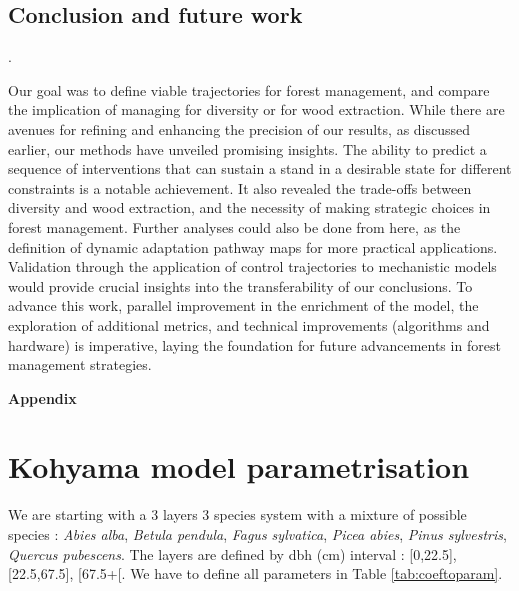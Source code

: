 \documentclass{article}
\begin{document}
\subsection{Conclusion and future work}.

Our goal was to define viable trajectories for forest management, and compare the implication of managing for diversity or for wood extraction. While there are avenues for refining and enhancing the precision of our results, as discussed earlier, our methods have unveiled promising insights. The ability to predict a sequence of interventions that can sustain a stand in a desirable state for different constraints is a notable achievement. It also revealed the trade-offs between diversity and wood extraction, and the necessity of making strategic choices in forest management.
Further analyses could also be done from here, as the definition of dynamic adaptation pathway maps for more practical applications. Validation through the application of control trajectories to mechanistic models would provide crucial insights into the transferability of our conclusions. To advance this work, parallel improvement in the enrichment of the model, the exploration of additional metrics, and technical improvements (algorithms and hardware) is imperative, laying the foundation for future advancements in forest management strategies.

\clearpage

\begin{singlespace}
    \printbibliography
\end{singlespace}

\clearpage


\begin{center}
    \textbf{\Large Appendix}
\end{center}


\renewcommand{\thefigure}{S.\arabic{figure}}
\setcounter{figure}{0}
\renewcommand{\thetable}{S.\arabic{table}}
\setcounter{table}{0}

\appendix

\section{Kohyama model parametrisation}

We are starting with a 3 layers 3 species system with a mixture of possible species : \textit{Abies alba}, \textit{Betula pendula}, \textit{Fagus sylvatica}, \textit{Picea abies}, \textit{Pinus sylvestris}, \textit{Quercus pubescens}. The layers are defined by dbh (cm) interval : [0,22.5], [22.5,67.5], [67.5+[. We have to define all parameters in Table \ref{tab:coeftoparam}.
\end{document}
